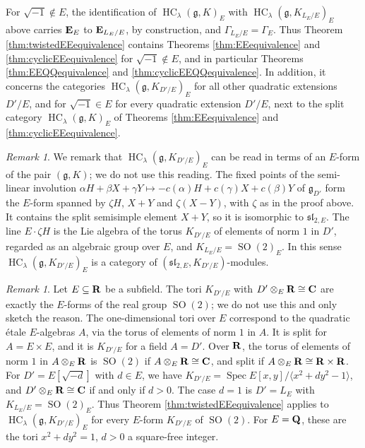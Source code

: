 \documentclass[a4paper,12pt,reqno]{amsart}
\newcommand{\CC}{{\rm\bf C}}
\newcommand{\RR}{{\rm\bf R}}
\newcommand{\QQ}{{\rm\bf Q}}
\newcommand{\EE}{{\rm\bf E}}
\DeclareMathOperator{\Spec}{\mathrm{Spec}}
\DeclareMathOperator{\SO}{\mathrm{SO}}
\DeclareMathOperator{\HC}{\mathrm{HC}}
\theoremstyle{plain}
\theoremstyle{remark}
\newtheorem{remark}[theorem]{Remark}
\begin{document}
    For $\sqrt{-1}\not\in E$, the identification of $\HC_\lambda(\mathfrak{g},K)_E$ with $\HC_\lambda(\mathfrak{g},K_{L_E/E})_E$ above carries $\EE_E$ to $\EE_{L_E/E}$, by construction, and $\Gamma_{L_E/E}=\Gamma_E$. Thus Theorem \ref{thm:twistedEEequivalence} contains Theorems \ref{thm:EEequivalence} and \ref{thm:cyclicEEequivalence} for $\sqrt{-1}\not\in E$, and in particular Theorems \ref{thm:EEQQequivalence} and \ref{thm:cyclicEEQQequivalence}. In addition, it concerns the categories $\HC_\lambda(\mathfrak{g},K_{D'/E})_E$ for all other quadratic extensions $D'/E$, and for $\sqrt{-1}\in E$ for every quadratic extension $D'/E$, next to the split category $\HC_\lambda(\mathfrak{g},K)_E$ of Theorems \ref{thm:EEequivalence} and \ref{thm:cyclicEEequivalence}.

    \begin{remark}\label{rmk:twistedforms}
      We remark that $\HC_\lambda(\mathfrak{g},K_{D'/E})_E$ can be read in terms of an $E$-form of the pair $(\mathfrak{g},K)$; we do not use this reading. The fixed points of the semi-linear involution $\alpha H+\beta X+\gamma Y\mapsto-c(\alpha)H+c(\gamma)X+c(\beta)Y$ of $\mathfrak{g}_{D'}$ form the $E$-form spanned by $\zeta H$, $X+Y$ and $\zeta(X-Y)$, with $\zeta$ as in the proof above. It contains the split semisimple element $X+Y$, so it is isomorphic to $\mathfrak{sl}_{2,E}$. The line $E\cdot\zeta H$ is the Lie algebra of the torus $K_{D'/E}$ of elements of norm $1$ in $D'$, regarded as an algebraic group over $E$, and $K_{L_E/E}=\SO(2)_E$. In this sense $\HC_\lambda(\mathfrak{g},K_{D'/E})_E$ is a category of $(\mathfrak{sl}_{2,E},K_{D'/E})$-modules.
    \end{remark}

    \begin{remark}\label{rmk:formsofSO2}
      Let $E\subseteq\RR$ be a subfield. The tori $K_{D'/E}$ with $D'\otimes_E\RR\cong\CC$ are exactly the $E$-forms of the real group $\SO(2)$; we do not use this and only sketch the reason. The one-dimensional tori over $E$ correspond to the quadratic \'etale $E$-algebras $A$, via the torus of elements of norm $1$ in $A$. It is split for $A=E\times E$, and it is $K_{D'/E}$ for a field $A=D'$. Over $\RR$, the torus of elements of norm $1$ in $A\otimes_E\RR$ is $\SO(2)$ if $A\otimes_E\RR\cong\CC$, and split if $A\otimes_E\RR\cong\RR\times\RR$. For $D'=E[\sqrt{-d}]$ with $d\in E$, we have $K_{D'/E}=\Spec E[x,y]/\langle x^2+dy^2-1\rangle$, and $D'\otimes_E\RR\cong\CC$ if and only if $d>0$. The case $d=1$ is $D'=L_E$ with $K_{L_E/E}=\SO(2)_E$. Thus Theorem \ref{thm:twistedEEequivalence} applies to $\HC_\lambda(\mathfrak{g},K_{D'/E})_E$ for every $E$-form $K_{D'/E}$ of $\SO(2)$. For $E=\QQ$, these are the tori $x^2+dy^2=1$, $d>0$ a square-free integer.
    \end{remark}
\end{document}
